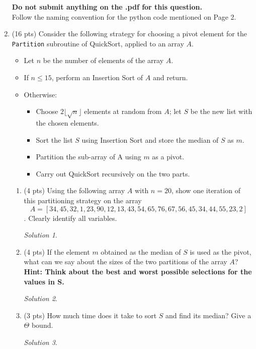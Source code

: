 \documentclass[12pt]{article}
\theoremstyle{remark}
\newtheorem*{solution}{Solution}
\begin{document}
\begin{enumerate}
\textbf{Do not submit anything on the .pdf for this question.}\\
Follow the naming convention for the python code mentioned on Page 2.
\pagebreak


\item (16 pts) Consider the following strategy for choosing a pivot element for the {\tt Partition} subroutine of QuickSort, applied to an array $A$.
\begin{itemize}
\item Let $n$ be the number of elements of the array $A$.
\item If $n\leq 15$, perform an Insertion Sort of $A$ and return.
\item Otherwise:
	\begin{itemize}
	\item Choose $2\lfloor \sqrt{n} \rfloor$ elements at random from $A$; let $S$ be the new list with the chosen elements.
	\item Sort the list $S$ using Insertion Sort and store the median of $S$ as $m$.
	\item Partition the sub-array of A using $m$ as a pivot.
	\item Carry out QuickSort recursively on the two parts.
	\end{itemize}
\end{itemize}
\begin{enumerate}
\item (4 pts) Using the following array $A$ with $n=20$, show one iteration of this partitioning strategy on the array $$A=[34, 45, 32, 1, 23, 90, 12, 13, 43, 54, 65, 76, 67, 56, 45, 34, 44, 55, 23, 2]$$. Clearly identify all variables.\\
\begin{solution}

\end{solution}
\pagebreak

\item (4 pts) If the element $m$ obtained as the median of $S$ is used as the pivot, what can we say about the sizes of the two partitions of the array $A$? \textbf{Hint: Think about the best and worst possible selections for the values in S.}\\
\begin{solution}

\end{solution}

\item (3 pts) How much time does it take to sort $S$ and find its median? Give a $\Theta$ bound.\\
\begin{solution}


\end{solution}
\end{enumerate}
\end{enumerate}
\end{document}
